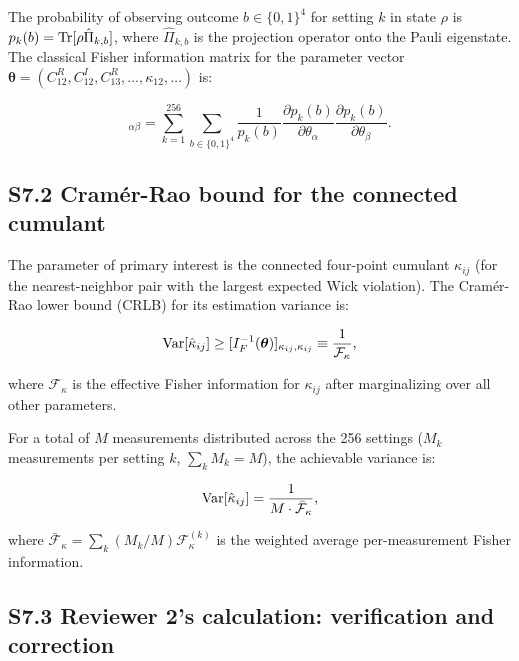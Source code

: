 \documentclass[prd,aps,showpacs,superscriptaddress,twocolumn]{revtex4-2}
\begin{document}
The probability of observing outcome $b \in \{0,1\}^4$ for setting $k$ in state $\rho$ is $p_k(b) = {\rm Tr}[\rho \hat{\Pi}_{k,b}]$, where $\hat{\Pi}_{k,b}$ is the projection operator onto the Pauli eigenstate. The classical Fisher information matrix for the parameter vector $\bm{\theta} = (C^R_{12}, C^I_{12}, C^R_{13}, \ldots, \kappa_{12}, \ldots)$ is:

\begin{equation}
[I_F(\bm{\theta})]_{\alpha\beta} = \sum_{k=1}^{256} \sum_{b \in \{0,1\}^4} \frac{1}{p_k(b)} \frac{\partial p_k(b)}{\partial \theta_\alpha} \frac{\partial p_k(b)}{\partial \theta_\beta}.
\label{eq:Fisher}
\end{equation}

\subsection{S7.2 Cram\'er-Rao bound for the connected cumulant}

The parameter of primary interest is the connected four-point cumulant $\kappa_{ij}$ (for the nearest-neighbor pair with the largest expected Wick violation). The Cram\'er-Rao lower bound (CRLB) for its estimation variance is:

\begin{equation}
{\rm Var}[\hat{\kappa}_{ij}] \geq [I_F^{-1}(\bm{\theta})]_{\kappa_{ij}, \kappa_{ij}} \equiv \frac{1}{\mathcal{F}_{\kappa}},
\label{eq:CRLB}
\end{equation}

where $\mathcal{F}_{\kappa}$ is the effective Fisher information for $\kappa_{ij}$ after marginalizing over all other parameters.

For a total of $M$ measurements distributed across the 256 settings ($M_k$ measurements per setting $k$, $\sum_k M_k = M$), the achievable variance is:

\begin{equation}
{\rm Var}[\hat{\kappa}_{ij}] = \frac{1}{M \cdot \bar{\mathcal{F}}_\kappa},
\label{eq:var_kappa}
\end{equation}

where $\bar{\mathcal{F}}_\kappa = \sum_k (M_k/M) \mathcal{F}_\kappa^{(k)}$ is the weighted average per-measurement Fisher information.

\subsection{S7.3 Reviewer 2's calculation: verification and correction}
\end{document}
